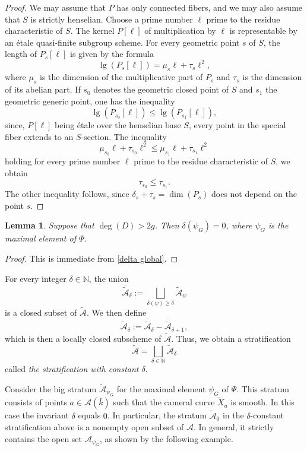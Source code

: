 \documentclass[12pt,english]{smfart}
\numberwithin{equation}{subsection}
\newtheorem{lemma}[equation]{Lemma}
\theoremstyle{remark}
\begin{document}
\begin{proof}
We may assume that $P$ has only connected fibers, and we may also assume that $S$ is strictly henselian. Choose a prime number $\ell$ prime to the residue characteristic of $S$. The kernel $P[\ell]$ of multiplication by $\ell$ is representable by an \'etale quasi-finite subgroup scheme. For every geometric point $s$ of $S$, the length of $P_s[\ell]$ is given by the formula
$$\lg(P_s[\ell])=\mu_s\ell+\tau_s\ell^2,$$
where $\mu_s$ is the dimension of the multiplicative part of $P_s$ and $\tau_s$ is the dimension of its abelian part. If $s_0$ denotes the geometric closed point of $S$ and $s_1$ the geometric generic point, one has the inequality
$$\lg(P_{s_0}[\ell])\leq \lg(P_{s_1}[\ell]),$$
since, $P[\ell]$ being \'etale over the henselian base $S$, every point in the special fiber extends to an $S$-section. The inequality
$$\mu_{s_0}\ell+\tau_{s_0}\ell^2\leq \mu_{s_1}\ell+\tau_{s_1}\ell^2$$
holding for every prime number $\ell$ prime to the residue characteristic of $S$, we obtain
$$\tau_{s_0}\leq \tau_{s_1}.$$
The other inequality follows, since $\delta_s+\tau_s=\dim(P_s)$ does not depend on the point $s$.
\end{proof}

\begin{lemma}\label{delta psi_G nul}
Suppose that $\deg(D)>2g$. Then $\delta(\psi_G)=0$, where $\psi_G$ is the maximal element of $\Psi$.
\end{lemma}

\begin{proof}
This is immediate from \ref{delta global}.
\end{proof}

For every integer $\delta\in\mathbb{N}$, the union
$$
\overline{\tilde{\mathcal{A}}}_\delta:=\bigsqcup_{\delta(\psi)\geq \delta} \tilde{\mathcal{A}}_\psi
$$
is a closed subset of $\tilde{\mathcal{A}}$. We then define 
$$\tilde{\mathcal{A}}_\delta:=\overline{\tilde{\mathcal{A}}}_\delta-\overline{\tilde{\mathcal{A}}}_{\delta+1},$$
which is then a locally closed subscheme of $\tilde{\mathcal{A}}$. Thus, we obtain a stratification
\begin{equation}\label{stratification delta}
\tilde{\mathcal{A}}=\bigsqcup_{\delta\in\mathbb{N}}\tilde{\mathcal{A}}_\delta
\end{equation}
called \emph{the stratification with constant $\delta$}.

Consider the big stratum $\tilde{\mathcal{A}}_{\psi_G}$ for the maximal element $\psi_G$ of $\Psi$. This stratum consists of points $a\in\mathcal{A}(\bar{k})$ such that the cameral curve $\widetilde X_a$ is smooth. In this case the invariant $\delta$ equals $0$. In particular, the stratum $\tilde{\mathcal{A}}_{0}$ in the $\delta$-constant stratification above is a nonempty open subset of $\mathcal{A}$. In general, it strictly contains the open set $\mathcal{A}_{\psi_G}$, as shown by the following example.
\end{document}

